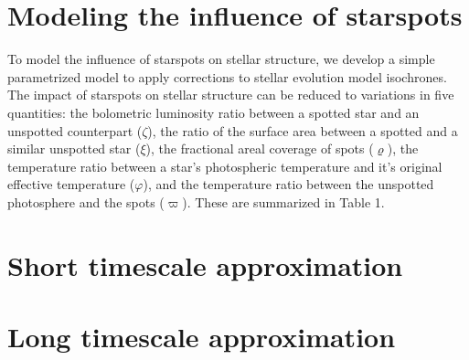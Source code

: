 \section{Modeling the influence of starspots}

To model the influence of starspots on stellar structure, we develop a simple parametrized model to apply corrections to stellar evolution model isochrones. The impact of starspots on stellar structure can be reduced to variations in five quantities: the bolometric luminosity ratio between a spotted star and an unspotted counterpart ($\zeta$), the ratio of the surface area between a spotted and a similar unspotted star ($\xi$), the fractional areal coverage of spots ($\varrho$), the temperature ratio between a star’s photospheric temperature and it's original effective temperature ($\varphi$), and the temperature ratio between the unspotted photosphere and the spots ($\varpi$). These are summarized in Table 1.

\section{Short timescale approximation}

\section{Long timescale approximation}